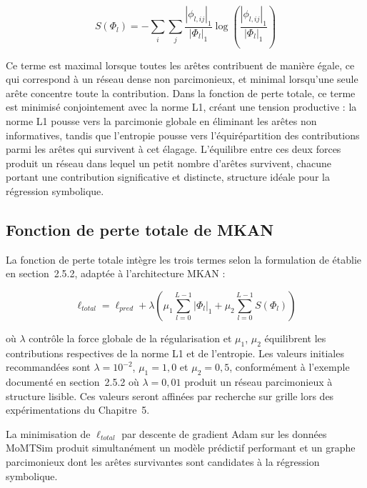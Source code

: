 \documentclass[11pt,a4paper,oneside]{report}
\theoremstyle{definition}
\theoremstyle{remark}
\begin{document}
\begin{equation}
S(\Phi_l) = -\sum_{i}\sum_{j}\frac{|\phi_{l,ij}|_1}{|\Phi_l|_1}\log\left(\frac{|\phi_{l,ij}|_1}{|\Phi_l|_1}\right)
\label{eq:entropie-couche}
\end{equation}

Ce terme est maximal lorsque toutes les arêtes contribuent de manière égale, ce qui correspond à un réseau dense non parcimonieux, et minimal lorsqu'une seule arête concentre toute la contribution. Dans la fonction de perte totale, ce terme est minimisé conjointement avec la norme L1, créant une tension productive : la norme L1 pousse vers la parcimonie globale en éliminant les arêtes non informatives, tandis que l'entropie pousse vers l'équirépartition des contributions parmi les arêtes qui survivent à cet élagage. L'équilibre entre ces deux forces produit un réseau dans lequel un petit nombre d'arêtes survivent, chacune portant une contribution significative et distincte, structure idéale pour la régression symbolique.

\subsection{Fonction de perte totale de MKAN}
\label{subsubsec:perte-totale}

La fonction de perte totale intègre les trois termes selon la formulation de \citet{liu2024kan} établie en section~2.5.2, adaptée à l'architecture MKAN :

\begin{equation}
\ell_{total} = \ell_{pred} + \lambda\left(\mu_1 \sum_{l=0}^{L-1}|\Phi_l|_1 + \mu_2 \sum_{l=0}^{L-1}S(\Phi_l)\right)
\label{eq:perte-totale-mkan}
\end{equation}

où $\lambda$ contrôle la force globale de la régularisation et $\mu_1$, $\mu_2$ équilibrent les contributions respectives de la norme L1 et de l'entropie. Les valeurs initiales recommandées sont $\lambda = 10^{-2}$, $\mu_1 = 1{,}0$ et $\mu_2 = 0{,}5$, conformément à l'exemple documenté en section~2.5.2 où $\lambda = 0{,}01$ produit un réseau parcimonieux à structure lisible. Ces valeurs seront affinées par recherche sur grille lors des expérimentations du Chapitre~5.

La minimisation de $\ell_{total}$ par descente de gradient Adam sur les données MoMTSim produit simultanément un modèle prédictif performant et un graphe parcimonieux dont les arêtes survivantes sont candidates à la régression symbolique.
\end{document}
